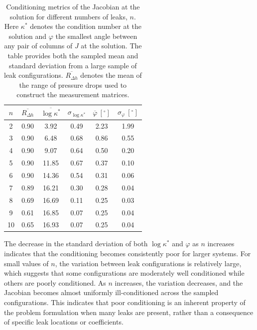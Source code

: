 \begin{table}[ht]
\centering
\renewcommand{\arraystretch}{1.5}
\begin{tabular}{ c c | c c | c c }
\hline
$n$ 
& $\overline{R_{\Delta h}}$
& $\overline{\log\kappa^*}$
& $\sigma_{\log\kappa^*}$
& $\overline{\varphi}\ [^\circ]$
& $\sigma_{\varphi}\ [^\circ]$
\\
\hline
2 & 0.90 & 3.92 & 0.49 & 2.23 & 1.99 \\
3 & 0.90 & 6.48 & 0.68 & 0.86 & 0.55 \\
4 & 0.90 & 9.07 & 0.64 & 0.50 & 0.20 \\
5 & 0.90 & 11.85 & 0.67 & 0.37 & 0.10 \\
6 & 0.90 & 14.36 & 0.54 & 0.31 & 0.06 \\
7 & 0.89 & 16.21 & 0.30 & 0.28 & 0.04 \\
8 & 0.69 & 16.69 & 0.11 & 0.25 & 0.03 \\
9 & 0.61 & 16.85 & 0.07 & 0.25 & 0.04 \\
10 & 0.65 & 16.93 & 0.07 & 0.25 & 0.04 \\
\hline
\end{tabular}
\caption[Conditioning metrics of the Jacobian at the solution for different numbers of leaks]{Conditioning metrics of the Jacobian at the solution for different numbers of leaks, $n$. Here $\kappa^*$ denotes the condition number at the solution and $\varphi$ the smallest angle between any pair of columns of $J$ at the solution. The table provides both the sampled mean and standard deviation from a large sample of leak configurations. $\overline{R_{\Delta h}}$ denotes the mean of the range of pressure drops used to construct the measurement matrices.}
\label{tab:cond_nums}
\end{table}

The decrease in the standard deviation of both $\log \kappa^*$ and $\varphi$ as $n$ increases indicates that the conditioning becomes consistently poor for larger systems. For small values of $n$, the variation between leak configurations is relatively large, which suggests that some configurations are moderately well conditioned while others are poorly conditioned. As $n$ increases, the variation decreases, and the Jacobian becomes almost uniformly ill-conditioned across the sampled configurations. This indicates that poor conditioning is an inherent property of the problem formulation when many leaks are present, rather than a consequence of specific leak locations or coefficients.\\

